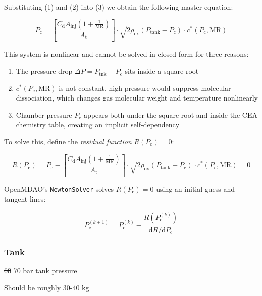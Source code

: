 \documentclass[fleqn]{article}
\begin{document}
Substituting (1) and (2) into (3) we obtain the following master equation:

\begin{equation*}
P_\text{c}
= \left[
    \frac{C_\mathrm{d} A_\text{inj} \left(1 + \frac{1}{\mathrm{MR}}\right)}
         {A_\text{t}}
  \right]
  \cdot \sqrt{2\rho_\text{ox} (P_\text{tank} - P_\text{c})}
  \cdot c^* (P_\text{c}, \mathrm{MR})
\end{equation*}

This system is nonlinear and cannot be solved in closed form for three reasons:

\begin{enumerate}
\item The pressure drop \(\Delta P = P_\text{tnk} - P_\text{c}\) sits inside a square
root

\item \(c^* (P_\text{c}, \mathrm{MR})\) is not constant, high pressure would suppress
molecular dissociation, which changes gas molecular weight and temperature
nonlinearly

\item Chamber pressure \(P_\text{c}\) appears both under the square root and inside
the CEA chemistry table, creating an implicit self-dependency
\end{enumerate}

To solve this, define the \emph{residual function} \(R(P_\text{c}) = 0\):

\begin{equation*}
R(P_\text{c})
= P_\text{c}
  - \left[
    \frac{C_\mathrm{d} A_\text{inj} \left(1 + \frac{1}{\mathrm{MR}}\right)}
         {A_\text{t}}
  \right]
  \cdot \sqrt{2\rho_\text{ox} (P_\text{tank} - P_\text{c})}
  \cdot c^* (P_\text{c}, \mathrm{MR})
= 0
\end{equation*}

OpenMDAO's \texttt{NewtonSolver} solves \(R(P_\text{c})=0\) using an initial guess and
tangent lines:

\begin{equation*}
P_\text{c}^{(k+1)}
= P_\text{c}^{(k)}
  - \frac{R(P_\text{c}^{(k)})}{\mathrm{d} R / \mathrm{d} P_\text{c}}
\end{equation*}
\subsubsection{Tank}
\label{sec:org1a3e8b6}

\sout{60} 70 bar tank pressure

Should be roughly 30-40 kg
\end{document}
